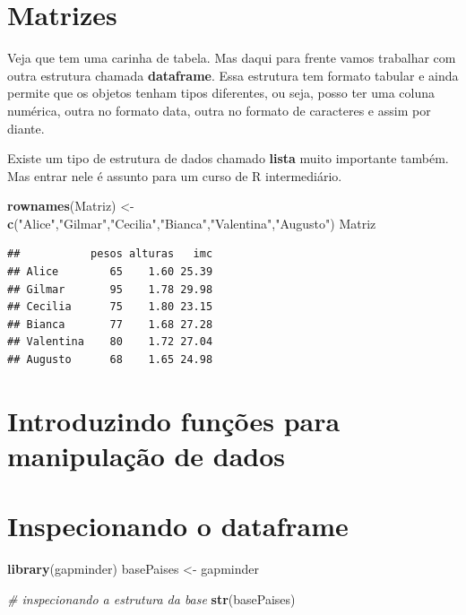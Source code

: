 \documentclass[
]{article}
\newenvironment{Shaded}{\begin{snugshade}}{\end{snugshade}}
\newcommand{\CommentTok}[1]{\textcolor[rgb]{0.56,0.35,0.01}{\textit{#1}}}
\newcommand{\KeywordTok}[1]{\textcolor[rgb]{0.13,0.29,0.53}{\textbf{#1}}}
\newcommand{\NormalTok}[1]{#1}
\newcommand{\StringTok}[1]{\textcolor[rgb]{0.31,0.60,0.02}{#1}}
\begin{document}
\hypertarget{matrizes-1}{%
\section{Matrizes}\label{matrizes-1}}

Veja que tem uma carinha de tabela. Mas daqui para frente vamos
trabalhar com outra estrutura chamada \textbf{dataframe}. Essa estrutura
tem formato tabular e ainda permite que os objetos tenham tipos
diferentes, ou seja, posso ter uma coluna numérica, outra no formato
data, outra no formato de caracteres e assim por diante.

Existe um tipo de estrutura de dados chamado \textbf{lista} muito
importante também. Mas entrar nele é assunto para um curso de R
intermediário.

\begin{Shaded}
\begin{Highlighting}[]
\KeywordTok{rownames}\NormalTok{(Matriz) <-}\StringTok{ }\KeywordTok{c}\NormalTok{(}\StringTok{"Alice"}\NormalTok{,}\StringTok{"Gilmar"}\NormalTok{,}\StringTok{"Cecilia"}\NormalTok{,}\StringTok{"Bianca"}\NormalTok{,}\StringTok{"Valentina"}\NormalTok{,}\StringTok{"Augusto"}\NormalTok{)}
\NormalTok{Matriz}
\end{Highlighting}
\end{Shaded}

\begin{verbatim}
##           pesos alturas   imc
## Alice        65    1.60 25.39
## Gilmar       95    1.78 29.98
## Cecilia      75    1.80 23.15
## Bianca       77    1.68 27.28
## Valentina    80    1.72 27.04
## Augusto      68    1.65 24.98
\end{verbatim}

\hypertarget{introduzindo-funuxe7uxf5es-para-manipulauxe7uxe3o-de-dados}{%
\section{Introduzindo funções para manipulação de
dados}\label{introduzindo-funuxe7uxf5es-para-manipulauxe7uxe3o-de-dados}}

\hypertarget{inspecionando-o-dataframe}{%
\section{Inspecionando o dataframe}\label{inspecionando-o-dataframe}}

\begin{Shaded}
\begin{Highlighting}[]
\KeywordTok{library}\NormalTok{(gapminder)}
\NormalTok{basePaises <-}\StringTok{ }\NormalTok{gapminder}

\CommentTok{# inspecionando a estrutura da base}
\KeywordTok{str}\NormalTok{(basePaises)}
\end{Highlighting}
\end{Shaded}
\end{document}
